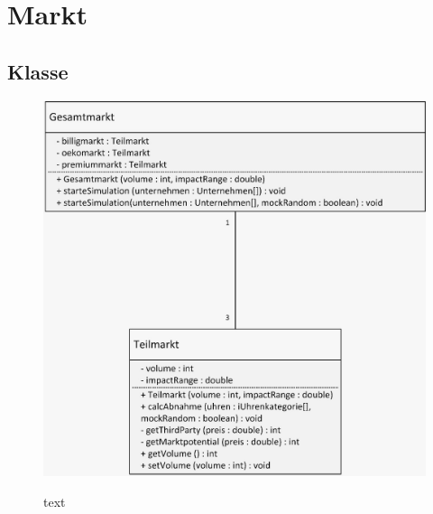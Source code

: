 \clearpage
\chapter{Markt}
\section{Klasse}
\begin{figure} [!h]
	\centering
	\includegraphics[scale=0.3]{img/Markt.jpeg} 
	\label{key}
	\caption{text}
\end{figure}
\clearpage
